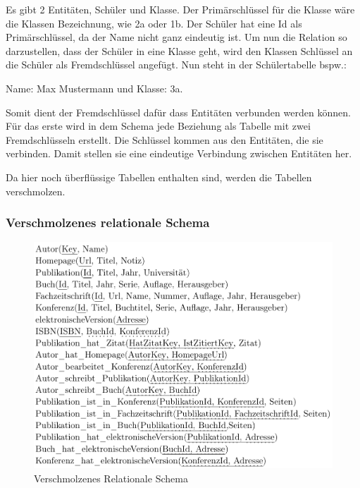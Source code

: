 Es gibt 2 Entitäten, Schüler und Klasse. Der Primärschlüssel für die Klasse wäre die Klassen Bezeichnung, wie 2a oder 1b. Der Schüler hat eine Id als Primärschlüssel, da der Name nicht ganz eindeutig ist. Um nun die Relation so darzustellen, dass der Schüler in eine Klasse geht, wird den Klassen Schlüssel an die Schüler als Fremdschlüssel angefügt. Nun steht in der Schülertabelle bspw.:

Name: Max Mustermann und Klasse: 3a. 

Somit dient der Fremdschlüssel dafür dass Entitäten verbunden werden können.
Für das erste wird in dem Schema jede Beziehung als Tabelle mit zwei Fremdschlüsseln
erstellt. Die Schlüssel kommen aus den Entitäten, die sie verbinden. Damit stellen sie eine eindeutige Verbindung zwischen Entitäten her.

Da hier noch überflüssige Tabellen enthalten sind, werden die Tabellen verschmolzen.



\subsubsection{Verschmolzenes relationale Schema}

\begin{figure}[!htb]
	\centering
	\includegraphics[width=13cm,keepaspectratio]{bilder/verschmolzenesRelationaleSchema}
	\caption{Verschmolzenes Relationale Schema}
	\label{fig:verschmolzenesrelationalesSchema}
\end{figure}






